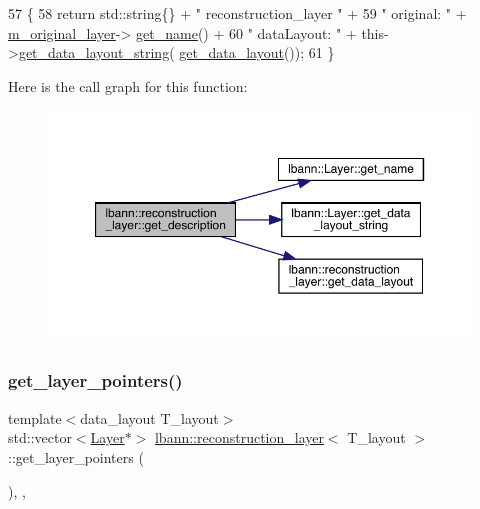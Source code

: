 \begin{DoxyCode}
57                                              \{
58     \textcolor{keywordflow}{return} std::string\{\} + \textcolor{stringliteral}{" reconstruction\_layer "} +
59                            \textcolor{stringliteral}{" original: "} + \hyperlink{classlbann_1_1reconstruction__layer_a077a29792de2a39015da8b18120a00e3}{m\_original\_layer}->
      \hyperlink{classlbann_1_1Layer_a80027550202fa7dbb1dd55fa8a66c84b}{get\_name}() +
60                            \textcolor{stringliteral}{" dataLayout: "} + this->\hyperlink{classlbann_1_1Layer_ae3f4a5602df821f4221614b1e3782dc1}{get\_data\_layout\_string}(
      \hyperlink{classlbann_1_1reconstruction__layer_a7516698ae3de4cea311ec17685a0b60a}{get\_data\_layout}());
61   \}
\end{DoxyCode}
Here is the call graph for this function\+:\nopagebreak
\begin{figure}[H]
\begin{center}
\leavevmode
\includegraphics[width=350pt]{classlbann_1_1reconstruction__layer_a738c3f06ea3cee1e8b11672fde6b594e_cgraph}
\end{center}
\end{figure}
\mbox{\label{classlbann_1_1reconstruction__layer_a52f5ebe2f2716b8cab5e768b1b82c3d0}} 
\subsubsection{\texorpdfstring{get\+\_\+layer\+\_\+pointers()}{get\_layer\_pointers()}}
{\footnotesize\ttfamily template$<$data\+\_\+layout T\+\_\+layout$>$ \\
std\+::vector$<$\hyperlink{classlbann_1_1Layer}{Layer}$\ast$$>$ \hyperlink{classlbann_1_1reconstruction__layer}{lbann\+::reconstruction\+\_\+layer}$<$ T\+\_\+layout $>$\+::get\+\_\+layer\+\_\+pointers (\begin{DoxyParamCaption}{ }\end{DoxyParamCaption})\hspace{0.3cm}{\ttfamily [inline]}, {\ttfamily [override]}, {\ttfamily [virtual]}}

